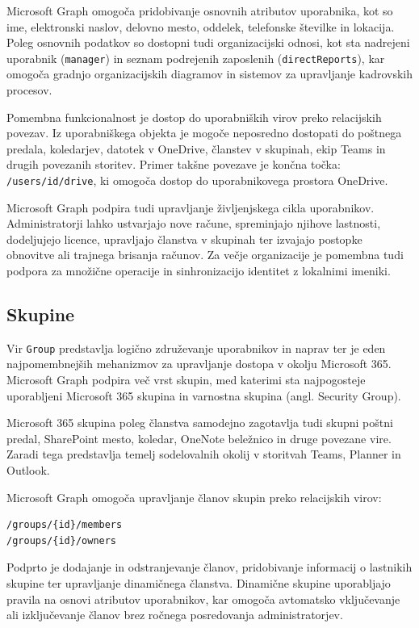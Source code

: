 \documentclass[a4paper, 12pt]{book}
\begin{document}
Microsoft Graph omogoča pridobivanje osnovnih atributov uporabnika, kot so ime, elektronski naslov, delovno mesto, oddelek, telefonske številke in lokacija. Poleg osnovnih podatkov so dostopni tudi organizacijski odnosi, kot sta nadrejeni uporabnik (\texttt{manager}) in seznam podrejenih zaposlenih (\texttt{directReports}), kar omogoča gradnjo organizacijskih diagramov in sistemov za upravljanje kadrovskih procesov.

Pomembna funkcionalnost je dostop do uporabniških virov preko relacijskih povezav. Iz uporabniškega objekta je mogoče neposredno dostopati do poštnega predala, koledarjev, datotek v OneDrive, članstev v skupinah, ekip Teams in drugih povezanih storitev. Primer takšne povezave je končna točka: \texttt{/users/{id}/drive}, ki omogoča dostop do uporabnikovega prostora OneDrive.

Microsoft Graph podpira tudi upravljanje življenjskega cikla uporabnikov. Administratorji lahko ustvarjajo nove račune, spreminjajo njihove lastnosti, dodeljujejo licence, upravljajo članstva v skupinah ter izvajajo postopke obnovitve ali trajnega brisanja računov. Za večje organizacije je pomembna tudi podpora za množične operacije in sinhronizacijo identitet z lokalnimi imeniki.

\subsection{Skupine}

Vir \texttt{Group} predstavlja logično združevanje uporabnikov in naprav ter je eden najpomembnejših mehanizmov za upravljanje dostopa v okolju Microsoft 365. Microsoft Graph podpira več vrst skupin, med katerimi sta najpogosteje uporabljeni Microsoft 365 skupina in varnostna skupina (angl. Security Group).

Microsoft 365 skupina poleg članstva samodejno zagotavlja tudi skupni poštni predal, SharePoint mesto, koledar, OneNote beležnico in druge povezane vire. Zaradi tega predstavlja temelj sodelovalnih okolij v storitvah Teams, Planner in Outlook.

Microsoft Graph omogoča upravljanje članov skupin preko relacijskih virov:

\begin{verbatim}
/groups/{id}/members
/groups/{id}/owners
\end{verbatim}

Podprto je dodajanje in odstranjevanje članov, pridobivanje informacij o lastnikih skupine ter upravljanje dinamičnega članstva. Dinamične skupine uporabljajo pravila na osnovi atributov uporabnikov, kar omogoča avtomatsko vključevanje ali izključevanje članov brez ročnega posredovanja administratorjev.
\end{document}
